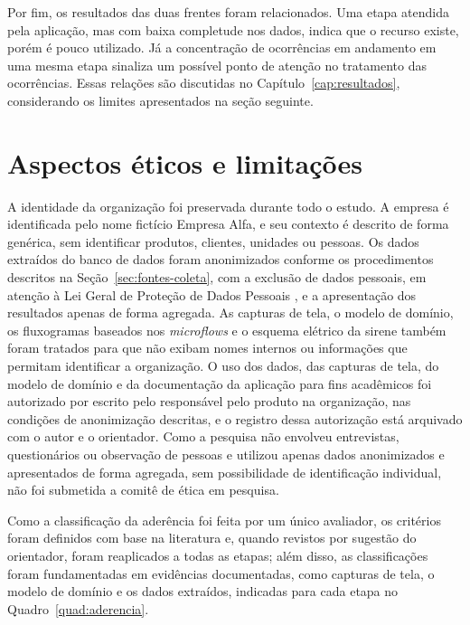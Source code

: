 Por fim, os resultados das duas frentes foram relacionados. Uma etapa atendida pela aplicação, mas com baixa completude nos dados, indica que o recurso existe, porém é pouco utilizado. Já a concentração de ocorrências em andamento em uma mesma etapa sinaliza um possível ponto de atenção no tratamento das ocorrências. Essas relações são discutidas no Capítulo~\ref{cap:resultados}, considerando os limites apresentados na seção seguinte.

\section{Aspectos éticos e limitações}
\label{sec:etica-limitacoes}

A identidade da organização foi preservada durante todo o estudo. A empresa é identificada pelo nome fictício Empresa Alfa, e seu contexto é descrito de forma genérica, sem identificar produtos, clientes, unidades ou pessoas. Os dados extraídos do banco de dados foram anonimizados conforme os procedimentos descritos na Seção~\ref{sec:fontes-coleta}, com a exclusão de dados pessoais, em atenção à Lei Geral de Proteção de Dados Pessoais \cite{brasil2018lgpd}, e a apresentação dos resultados apenas de forma agregada. As capturas de tela, o modelo de domínio, os fluxogramas baseados nos \textit{microflows} e o esquema elétrico da sirene também foram tratados para que não exibam nomes internos ou informações que permitam identificar a organização.
O uso dos dados, das capturas de tela, do modelo de domínio e da documentação da aplicação para fins acadêmicos foi autorizado por escrito pelo responsável pelo produto na organização, nas condições de anonimização descritas, e o registro dessa autorização está arquivado com o autor e o orientador. Como a pesquisa não envolveu entrevistas, questionários ou observação de pessoas e utilizou apenas dados anonimizados e apresentados de forma agregada, sem possibilidade de identificação individual, não foi submetida a comitê de ética em pesquisa.

Como a classificação da aderência foi feita por um único avaliador, os critérios foram definidos com base na literatura e, quando revistos por sugestão do orientador, foram reaplicados a todas as etapas; além disso, as classificações foram fundamentadas em evidências documentadas, como capturas de tela, o modelo de domínio e os dados extraídos, indicadas para cada etapa no Quadro~\ref{quad:aderencia}.

